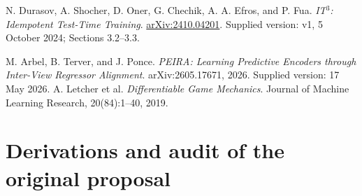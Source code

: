 \documentclass[11pt,a4paper]{article}
\newif\ifdraftnotes
\newcommand{\draftnote}[1]{\ifdraftnotes\par\smallskip
  {\small\color{gray}\noindent\textit{To develop:} #1\par}\smallskip\fi}
\begin{document}
\begin{thebibliography}{9}
N. Durasov, A. Shocher, D. Oner, G. Chechik, A. A. Efros, and P. Fua.
\emph{IT$^3$: Idempotent Test-Time Training}.
\href{https://arxiv.org/abs/2410.04201}{arXiv:2410.04201}.
Supplied version: v1, 5 October 2024; Sections 3.2--3.3.

M. Arbel, B. Terver, and J. Ponce.
\emph{PEIRA: Learning Predictive Encoders through Inter-View Regressor Alignment}.
arXiv:2605.17671, 2026. Supplied version: 17 May 2026.
A. Letcher et al.
\emph{Differentiable Game Mechanics}.
Journal of Machine Learning Research, 20(84):1--40, 2019.
\end{thebibliography}

\appendix
\section{Derivations and audit of the original proposal}
\draftnote{Place the lift-Jacobian derivation, toy phase portraits, the frozen-reference and detached-output derivative calculations,
and toy-model stability derivations here. Keep the main proposal centered
on adaptation, retention, and the selected theorem question.}
\end{document}
